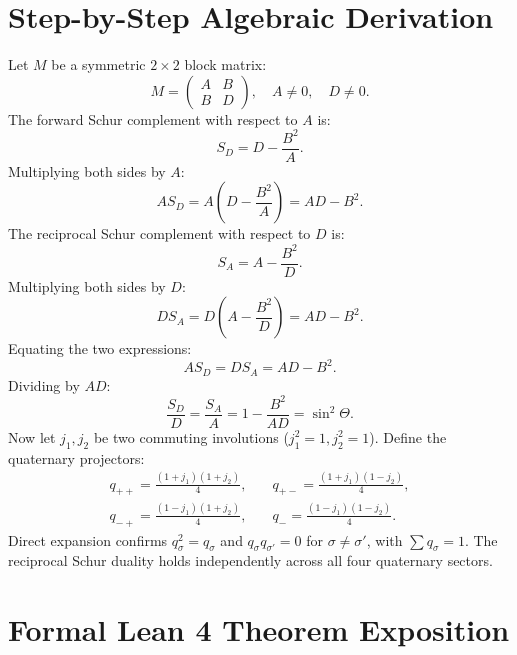 \documentclass[11pt,a4paper]{article}
\theoremstyle{definition}
\begin{document}
\section{Step-by-Step Algebraic Derivation}

Let $M$ be a symmetric $2 \times 2$ block matrix:
\begin{equation}
M = \begin{pmatrix} A & B \\ B & D \end{pmatrix}, \quad A \ne 0, \quad D \ne 0.
\end{equation}
The forward Schur complement with respect to $A$ is:
\begin{equation}
S_D = D - \frac{B^2}{A}.
\end{equation}
Multiplying both sides by $A$:
\begin{equation}
A S_D = A \left( D - \frac{B^2}{A} \right) = A D - B^2.
\end{equation}
The reciprocal Schur complement with respect to $D$ is:
\begin{equation}
S_A = A - \frac{B^2}{D}.
\end{equation}
Multiplying both sides by $D$:
\begin{equation}
D S_A = D \left( A - \frac{B^2}{D} \right) = A D - B^2.
\end{equation}
Equating the two expressions:
\begin{equation}
A S_D = D S_A = A D - B^2.
\end{equation}
Dividing by $A D$:
\begin{equation}
\frac{S_D}{D} = \frac{S_A}{A} = 1 - \frac{B^2}{A D} = \sin^2\Theta.
\end{equation}
Now let $j_1, j_2$ be two commuting involutions ($j_1^2 = 1, j_2^2 = 1$). Define the quaternary projectors:
\begin{align}
q_{++} = \frac{(1+j_1)(1+j_2)}{4}, &\quad q_{+-} = \frac{(1+j_1)(1-j_2)}{4}, \\
q_{-+} = \frac{(1-j_1)(1+j_2)}{4}, &\quad q_{ - } = \frac{(1-j_1)(1-j_2)}{4}.
\end{align}
Direct expansion confirms $q_{\sigma}^2 = q_{\sigma}$ and $q_{\sigma} q_{\sigma'} = 0$ for $\sigma \ne \sigma'$, with $\sum q_{\sigma} = 1$. The reciprocal Schur duality holds independently across all four quaternary sectors.


\section{Formal Lean 4 Theorem Exposition}
\end{document}
